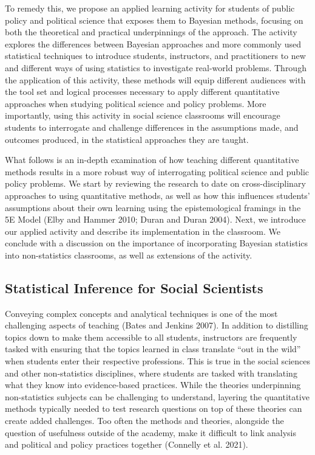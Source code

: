 \documentclass[
  12pt,
  letterpaper,
  DIV=11,
  numbers=noendperiod]{scrartcl}
\begin{document}
To remedy this, we propose an applied learning activity for students of
public policy and political science that exposes them to Bayesian
methods, focusing on both the theoretical and practical underpinnings of
the approach. The activity explores the differences between Bayesian
approaches and more commonly used statistical techniques to introduce
students, instructors, and practitioners to new and different ways of
using statistics to investigate real-world problems. Through the
application of this activity, these methods will equip different
audiences with the tool set and logical processes necessary to apply
different quantitative approaches when studying political science and
policy problems. More importantly, using this activity in social science
classrooms will encourage students to interrogate and challenge
differences in the assumptions made, and outcomes produced, in the
statistical approaches they are taught.

What follows is an in-depth examination of how teaching different
quantitative methods results in a more robust way of interrogating
political science and public policy problems. We start by reviewing the
research to date on cross-disciplinary approaches to using quantitative
methods, as well as how this influences students' assumptions about
their own learning using the epistemological framings in the 5E Model
(Elby and Hammer 2010; Duran and Duran 2004). Next, we introduce our
applied activity and describe its implementation in the classroom. We
conclude with a discussion on the importance of incorporating Bayesian
statistics into non-statistics classrooms, as well as extensions of the
activity.

\hypertarget{statistical-inference-for-social-scientists}{%
\subsection{Statistical Inference for Social
Scientists}\label{statistical-inference-for-social-scientists}}

Conveying complex concepts and analytical techniques is one of the most
challenging aspects of teaching (Bates and Jenkins 2007). In addition to
distilling topics down to make them accessible to all students,
instructors are frequently tasked with ensuring that the topics learned
in class translate ``out in the wild'' when students enter their
respective professions. This is true in the social sciences and other
non-statistics disciplines, where students are tasked with translating
what they know into evidence-based practices. While the theories
underpinning non-statistics subjects can be challenging to understand,
layering the quantitative methods typically needed to test research
questions on top of these theories can create added challenges. Too
often the methods and theories, alongside the question of usefulness
outside of the academy, make it difficult to link analysis and political
and policy practices together (Connelly et al. 2021).
\end{document}
